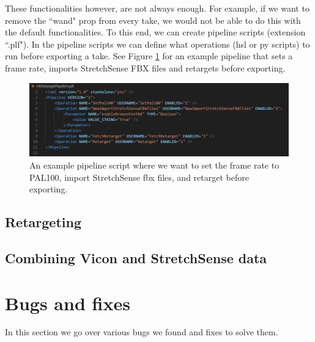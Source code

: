 \documentclass{uva-inf-article}
\begin{document}
These functionalities however, are not always enough. For example, if we want to remove the ``wand" prop from every take, we would not be able to do this with the default functionalities. To this end, we can create pipeline scripts (extension ``.plf"). In the pipeline scripts we can define what operations (hsl or py scripts) to run before exporting a take. See Figure \ref{fig:pipelineHE} for an example pipeline that sets a frame rate, imports StretchSense FBX files and retargets before exporting.
\begin{figure}[hbt!]
    \centering
    \includegraphics[width=\textwidth]{imgs/pipelineHE.png}
    \caption{An example pipeline script where we want to set the frame rate to PAL100, import StretchSense fbx files, and retarget before exporting.}
    \label{fig:pipelineHE}
\end{figure}

\subsection{Retargeting}

\subsection{Combining Vicon and StretchSense data}


\section{Bugs and fixes}
In this section we go over various bugs we found and fixes to solve them.
\end{document}
